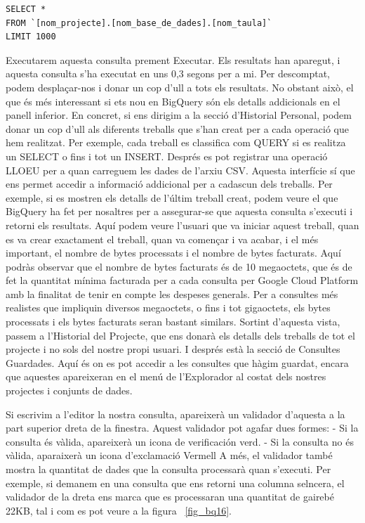 \documentclass[12pt,longbibliography]{article}
\theoremstyle{definition}
\theoremstyle{remark}
\begin{document}
\begin{verbatim}
SELECT *
FROM `[nom_projecte].[nom_base_de_dades].[nom_taula]`
LIMIT 1000
\end{verbatim}

\vspace{2mm}

Executarem aquesta consulta prement Executar. Els resultats han aparegut, i aquesta consulta s'ha executat en uns 0,3 segons per a mi. Per descomptat, podem desplaçar-nos i donar un cop d'ull a tots els resultats. No obstant això, el que és més interessant si ets nou en BigQuery són els detalls addicionals en el panell inferior. En concret, si ens dirigim a la secció d'Historial Personal, podem donar un cop d'ull als diferents treballs que s'han creat per a cada operació que hem realitzat. Per exemple, cada treball es classifica com QUERY si es realitza un SELECT o fins i tot un INSERT. Després es pot registrar una operació LLOEU per a quan carreguem les dades de l'arxiu CSV. Aquesta interfície sí que ens permet accedir a informació addicional per a cadascun dels treballs. Per exemple, si es mostren els detalls de l'últim treball creat, podem veure el que BigQuery ha fet per nosaltres per a assegurar-se que aquesta consulta s'executi i retorni els resultats. Aquí podem veure l'usuari que va iniciar aquest treball, quan es va crear exactament el treball, quan va començar i va acabar, i el més important, el nombre de bytes processats i el nombre de bytes facturats. Aquí podràs observar que el nombre de bytes facturats és de 10 megaoctets, que és de fet la quantitat mínima facturada per a cada consulta per Google Cloud Platform amb la finalitat de tenir en compte les despeses generals. Per a consultes més realistes que impliquin diversos megaoctets, o fins i tot gigaoctets, els bytes processats i els bytes facturats seran bastant similars. Sortint d'aquesta vista, passem a l'Historial del Projecte, que ens donarà els detalls dels treballs de tot el projecte i no sols del nostre propi usuari. I després està la secció de Consultes Guardades. Aquí és on es pot accedir a les consultes que hàgim guardat, encara que aquestes apareixeran en el menú de l'Explorador al costat dels nostres projectes i conjunts de dades.

\vspace{2mm}


Si escrivim a l’editor la nostra consulta, apareixerà un validador d’aquesta a la part superior dreta de la finestra. Aquest validador pot agafar dues formes:
- Si la consulta és vàlida, apareixerà un icona de verificación verd.
- Si la consulta no és vàlida, aparaixerà un icona d’exclamació Vermell
A més, el validador també mostra la quantitat de dades que la consulta processarà quan s’executi. Per exemple, si demanem en una consulta que ens retorni una columna selncera, el validador de la dreta ens marca que es processaran una quantitat de gairebé 22KB, tal i com es pot veure a la figura ~\ref{fig_bq16}.
\end{document}
